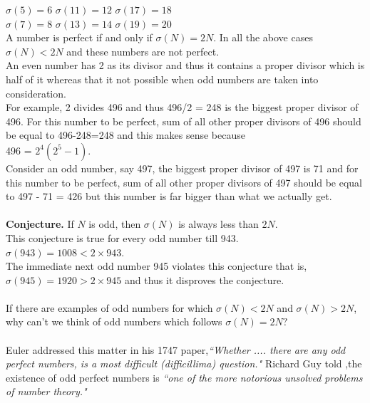 \documentclass[a4paper,11pt]{article}
\begin{document}
$\sigma(5) = 6$ \hspace{1cm} $\sigma(11) = 12$ \hspace{1cm} $\sigma(17) = 18$\\
$\sigma(7) = 8$ \hspace{1cm} $\sigma(13) = 14$ \hspace{1cm}  $\sigma(19) = 20$\\
A number is perfect if and only if $\sigma(N) = 2N.$
In all the above cases $\sigma(N) < 2N $ and these numbers are not perfect.\\
An even number has 2 as its divisor and thus it contains a proper divisor which is half of it whereas that it not possible when odd numbers are taken into consideration.\\
For example, 2 divides 496 and thus 496/2 = 248 is the biggest proper divisor of 496. For this number to be perfect, sum of all other proper divisors of 496 should be equal to 496-248=248 and this makes sense because\\ 496 = $2^4(2^5-1).$\\
Consider an odd number, say 497, the biggest proper divisor of 497 is 71 and for this number to be perfect, sum of all other proper divisors of 497 should be equal to 497 - 71 = 426 but this number is far bigger than what we actually get.\\
\\
\textbf{Conjecture.} If $N$ is odd, then $\sigma(N)$ is always less than $2N$. \\
This conjecture is true for every odd number till 943.\\ $\sigma(943) = 1008 < 2 \times 943$. \\
The immediate next odd number 945 violates this conjecture that is, \\$\sigma(945) = 1920 > 2 \times 945$ and thus it disproves the conjecture.\\
\\
If there are examples of odd numbers for which $\sigma(N) < 2N$ and $\sigma(N) > 2N$, why can't we think of odd numbers which follows $\sigma(N) = 2N ? $\\
\\
Euler addressed this matter in his 1747 paper,\textit{``Whether .... there are any odd perfect numbers, is a most difficult (difficillima) question."}
Richard Guy told ,the existence of odd perfect numbers is \textit{``one of the 
more notorious unsolved problems of number theory."}\\
\\
\end{document}
